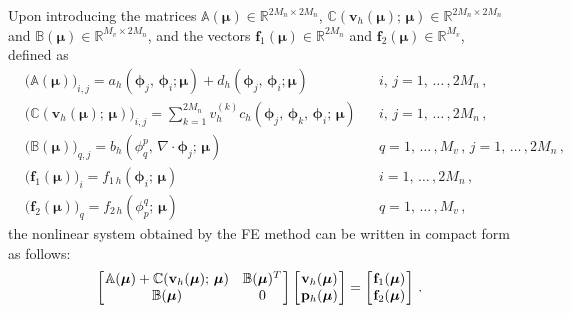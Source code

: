 \documentclass[12pt, a4paper, twoside, openright, notitlepage]{report}
\numberwithin{equation}{chapter}
\theoremstyle{theorem}
\theoremstyle{definition}
\theoremstyle{remark}
\theoremstyle{proposition}
\numberwithin{figure}{chapter}
\newcommand{\bg}[1]{\boldsymbol{#1}}
\begin{document}
		Upon introducing the matrices $\mathbb{A}(\bg{\mu}) \in \mathbb{R}^{2 M_n \times 2 M_n}$, $\mathbb{C}(\mathbf{v}_h(\bg{\mu}); \, \bg{\mu}) \in \mathbb{R}^{2 M_n \times 2 M_n}$ and $\mathbb{B}(\bg{\mu}) \in \mathbb{R}^{M_v \times 2 M_n}$, and the vectors $\mathbf{f}_1(\bg{\mu}) \in \mathbb{R}^{2 M_n}$ and $\mathbf{f}_2(\bg{\mu}) \in \mathbb{R}^{M_v}$, defined as
		\begin{equation*}
			\begin{aligned}
				& \big( \mathbb{A}(\bg{\mu}) \big)_{i,j} = a_h(\bg{\phi}_j, \, \bg{\phi}_i; \bg{\mu}) + d_h(\bg{\phi}_j, \, \bg{\phi}_i; \bg{\mu}) && i, \, j = 1, \, \ldots \, , 2 M_n \, , \\
				& \big( \mathbb{C}(\mathbf{v}_h(\bg{\mu}); \, \bg{\mu}) \big)_{i,j} = \sum_{k = 1}^{2 M_n} v_h^{(k)} c_h(\bg{\phi}_j, \, \bg{\phi}_k, \, \bg{\phi}_i; \, \bg{\mu}) && i, \, j = 1, \, \ldots \, , 2 M_n \, , \\
				\label{eq:B}
				& \big( \mathbb{B}(\bg{\mu}) \big)_{q,j} = b_h(\phi_q^p, \, \nabla \cdot \bg{\phi}_j; \, \bg{\mu}) && q = 1, \, \ldots \, , M_v \, , \, j = 1, \, \ldots \, , 2 M_n \, , \\
				& \big( \mathbf{f}_1(\bg{\mu}) \big)_i = f_{1\,h}(\bg{\phi}_i; \, \bg{\mu}) && i = 1, \, \ldots \, , 2 M_n \, , \\
				& \big( \mathbf{f}_2(\bg{\mu}) \big)_q = f_{2\,h}(\phi_p^q; \, \bg{\mu}) && q = 1, \, \ldots \, , M_v \, ,
			\end{aligned}
		\end{equation*}
		the nonlinear system obtained by the FE method can be written in compact form as follows:
		\begin{equation}
			\label{eq:ns-system}
			\begin{bmatrix}
			\hspace*{-0.15cm}
			\begin{array}{cc}
				\mathbb{A}(\bg{\mu}) + \mathbb{C}(\mathbf{v}_h(\bg{\mu}); \, \bg{\mu}) & \mathbb{B}(\bg{\mu})^T \\
				\mathbb{B}(\bg{\mu}) & 0
			\end{array} 
			\hspace*{-0.15cm}
			\end{bmatrix} 
			\begin{bmatrix}
			\hspace*{-0.15cm}
			\begin{array}{c}
				\mathbf{v}_h(\bg{\mu}) \\
				\mathbf{p}_h(\bg{\mu})
			\end{array} 
			\hspace*{-0.15cm}
			\end{bmatrix} 
			=
			\begin{bmatrix}
			\hspace*{-0.15cm}
			\begin{array}{c}
				\mathbf{f}_1(\bg{\mu}) \\
				\mathbf{f}_2(\bg{\mu})
			\end{array} 
			\hspace*{-0.15cm}
			\end{bmatrix} \, .
		\end{equation}
\end{document}

